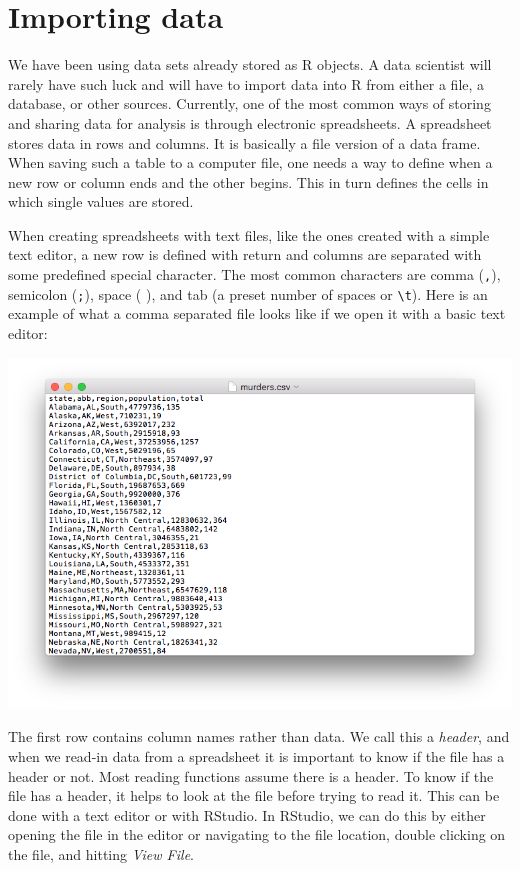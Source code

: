 \documentclass[
]{krantz}
\begin{document}
\hypertarget{importing-data}{%
\chapter{Importing data}\label{importing-data}}

We have been using data sets already stored as R objects. A data scientist will rarely have such luck and will have to import data into R from either a file, a database, or other sources. Currently, one of the most common ways of storing and sharing data for analysis is through electronic spreadsheets. A spreadsheet stores data in rows and columns. It is basically a file version of a data frame. When saving such a table to a computer file, one needs a way to define when a new row or column ends and the other begins. This in turn defines the cells in which single values are stored.

When creating spreadsheets with text files, like the ones created with a simple text editor, a new row is defined with return and columns are separated with some predefined special character. The most common characters are comma (\texttt{,}), semicolon (\texttt{;}), space ( ), and tab (a preset number of spaces or \texttt{\textbackslash{}t}). Here is an example of what a comma separated file looks like if we open it with a basic text editor:

\begin{center}\includegraphics[width=0.7\linewidth]{R/img/csv-file} \end{center}

The first row contains column names rather than data. We call this a \emph{header}, and when we read-in data from a spreadsheet it is important to know if the file has a header or not. Most reading functions assume there is a header. To know if the file has a header, it helps to look at the file before trying to read it. This can be done with a text editor or with RStudio. In RStudio, we can do this by either opening the file in the editor or navigating to the file location, double clicking on the file, and hitting \emph{View File}.
\end{document}

